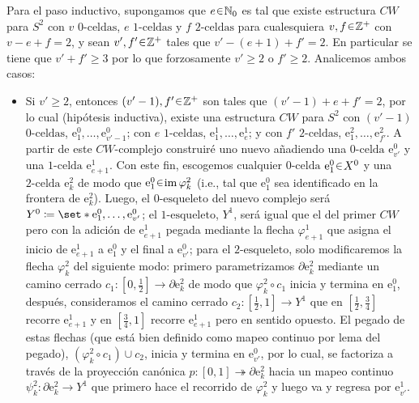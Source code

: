 \begin{sol}
Para el paso inductivo, supongamos que $e \en \mathbb{N}_0$ es tal que existe estructura $CW$ para $S^2$ con $v$ $0\text{-celdas}$, $e$ $1\text{-celdas}$ y $f$ $2\text{-celdas}$ para cualesquiera $v,f \en \mathbb{Z}^+$ con $v-e+f = 2$, y sean $v',f' \en \mathbb{Z}^+$ tales que $v' - (e+1) + f' = 2$. En particular se tiene que $v' + f' \geq 3$ por lo que forzosamente $v'\geq 2$ o $f' \geq 2$. Analicemos ambos casos:
\begin{itemize}
    \item Si $v' \geq 2$, entonces $(v'-1),f' \en \mathbb{Z}^+$ son tales que $(v'-1) + e + f' = 2$, por lo cual (hipótesis inductiva), existe una estructura $CW$ para $S^2$ con $(v'-1)$ $0\text{-celdas}$, $\mathrm{e}^0_1,\dots,\mathrm{e}^0_{v'-1}$; con $e$ $1\text{-celdas}$, $\mathrm{e}^1_1,\dots,\mathrm{e}^1_e$; y con $f'$ $2\text{-celdas}$, $\mathrm{e}^2_1,\dots,\mathrm{e}^2_{f'}$. A partir de este $CW\text{-complejo}$ construiré uno nuevo añadiendo una $0\text{-celda}$ $\mathrm{e}^0_{v'}$ y una $1\text{-celda}$ $\mathrm{e}^1_{e+1}$. Con este fin, escogemos cualquier $0\text{-celda}$ $\mathrm{e}^0_1 \en X^0$ y una $2\text{-celda}$ $\mathrm{e}^2_k$ de modo que $\mathrm{e}^0_1 \en \im\varphi^2_k$ (i.e., tal que $\mathrm{e}^0_1$ sea identificado en la frontera de $\mathrm{e}^2_k$). Luego, el $0\text{-esqueleto}$ del nuevo complejo será $Y^0 \coloneq \set*{\mathrm{e}^0_1,\dots,\mathrm{e}^0_{v'}}$; el $1\text{-esqueleto}$, $Y^1$, será igual que el del primer $CW$ pero con la adición de $\mathrm{e}^1_{e+1}$ pegada mediante la flecha $\varphi^1_{e+1}$ que asigna el inicio de $\mathrm{e}^1_{e+1}$ a $\mathrm{e}^0_{1}$ y el final a $\mathrm{e}^0_{v'}$; para el $2\text{-esqueleto}$, solo modificaremos la flecha $\varphi^2_k$ del siguiente modo: primero parametrizamos $\partial\mathrm{e}^2_k$ mediante un camino cerrado $c_1 \colon [0,\frac12] \to \partial\mathrm{e}^2_k$ de modo que $\varphi^2_k \circ c_1$ inicia y termina en $\mathrm{e}^0_1$, después, consideramos el camino cerrado $c_2 \colon [\frac12,1] \to Y^1$ que en $[\frac12,\frac34]$ recorre $\mathrm{e}^1_{e+1}$ y en $[\frac34,1]$ recorre $\mathrm{e}^1_{e+1}$ pero en sentido opuesto. El pegado de estas flechas (que está bien definido como mapeo continuo por lema del pegado), $(\varphi^2_k \circ c_1) \cup c_2$, inicia y termina en $\mathrm{e}^0_{v'}$, por lo cual, se factoriza a través de la proyección canónica $p \colon [0, 1] \twoheadrightarrow \partial\mathrm{e}^2_k$ hacia un mapeo continuo $\psi^2_k \colon \partial \mathrm{e}^2_k \to Y^1$ que primero hace el recorrido de $\varphi^2_k$ y luego va y regresa por $\mathrm{e}^1_{v'}$.

\end{itemize}
\end{sol}
